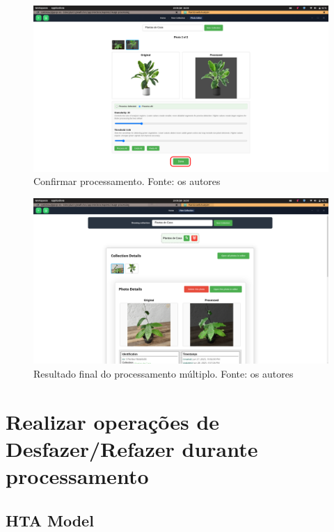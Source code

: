 \begin{figure}[H]
    \centering
    \includegraphics[width=1\textwidth]{../figures/screens/uc012/Screenshot from 2025-06-28 16-58-05.png}
    \caption{Confirmar processamento. Fonte: os autores}
    \label{fig:uc012-screen8}
\end{figure}

\begin{figure}[H]
    \centering
    \includegraphics[width=1\textwidth]{../figures/screens/uc012/Screenshot from 2025-06-28 16-58-13.png}
    \caption{Resultado final do processamento múltiplo. Fonte: os autores}
    \label{fig:uc012-screen9}
\end{figure}

\section{Realizar operações de Desfazer/Refazer durante processamento}

\subsection{HTA Model}

